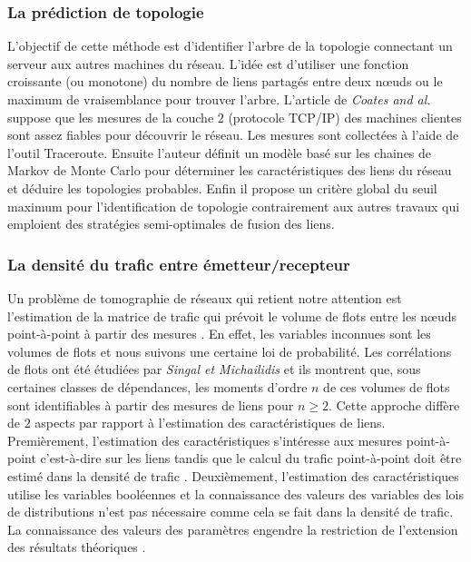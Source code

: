 \vspace{-0.4cm}  
\subsubsection{La pr\'ediction de topologie} 

L'objectif de cette m\'ethode est d'identifier l'arbre de la topologie connectant un serveur aux autres machines du r\'eseau.
L'id\'ee est d'utiliser une fonction croissante (ou monotone) du nombre de liens partag\'es entre deux n\oe uds ou le maximum de vraisemblance pour trouver l'arbre.
\newline
L'article de {\em Coates and al.} \cite{coatesCastroNowak2002} suppose que les mesures de la couche $2$ (protocole TCP/IP) des machines clientes sont assez fiables pour d\'ecouvrir le r\'eseau. Les mesures sont collect\'ees \`a l'aide de l'outil Traceroute. Ensuite l'auteur d\'efinit un mod\`ele bas\'e sur les chaines de Markov de Monte Carlo pour d\'eterminer les caract\'eristiques des liens du r\'eseau et d\'eduire les topologies probables. Enfin il propose un crit\`ere global du seuil maximum pour l'identification de topologie contrairement aux autres travaux \cite{andrieuDoucetFitzgerald2000bayesian, bestavrosAzerByers2005inference} qui emploient des strat\'egies semi-optimales de fusion des liens.
 
\subsubsection{La densit\'e du trafic entre \'emetteur/recepteur}

 Un probl\`eme de tomographie de r\'eseaux qui retient notre attention est l'estimation de la matrice de trafic qui pr\'evoit le volume de flots entre les n\oe uds point-\`a-point \`a partir des mesures \cite{vardi1996, caoDavisWielYu2000}.
En effet, les variables inconnues sont les volumes de flots et nous suivons une certaine loi de probabilit\'e.
\newline
Les corr\'elations de flots ont \'et\'e \'etudi\'ees par {\em Singal et Michailidis} \cite{singalMichailidis2007} et ils montrent que, sous certaines classes de d\'ependances, les moments d'ordre $n$ de ces volumes de flots sont identifiables \`a partir des mesures de liens pour $n \ge 2$.
Cette approche diff\`ere de $2$ aspects par rapport \`a l'estimation des caract\'eristiques de liens.
Premi\`erement, l'estimation des caract\'eristiques s'int\'eresse aux mesures point-\`a-point c'est-\`a-dire sur les liens tandis que le calcul du trafic point-\`a-point doit \^etre estim\'e dans la densit\'e de trafic \cite{vardi1996, singalMichailidis2007, caoDavisWielYu2000}.
Deuxi\`emement, l'estimation des caract\'eristiques utilise les variables bool\'eennes et la connaissance des valeurs des variables des lois de distributions n'est pas n\'ecessaire comme cela se fait dans la densit\'e de trafic. La connaissance des valeurs des param\`etres engendre la restriction de l'extension des r\'esultats th\'eoriques \cite{singalMichailidis2007}.
\newline

